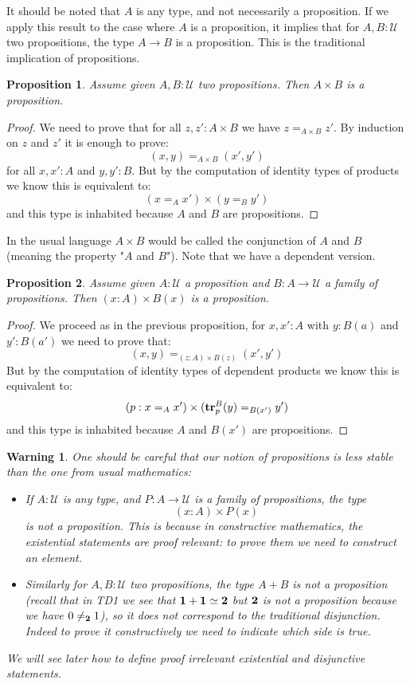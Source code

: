 \documentclass{article}
\newcommand{\U}{{\mathcal U}}
\renewcommand{\r}{\rightarrow}
\newcommand{\tr}{\mathrm{\bf tr}}
\newcommand{\one}{{\bf 1}}
\newcommand{\two}{{\bf 2}}
\newtheorem{proposition}{Proposition}
\newtheorem{warning}{\danger Warning}
\begin{document}
It should be noted that $A$ is any type, and not necessarily a proposition. If we apply this result to the case where $A$ is a proposition, it implies that for $A,B:\U$ two propositions, the type $A\r B$ is a proposition. This is the traditional implication of propositions.

\begin{proposition}
Assume given $A,B:\U$ two propositions. Then $A\times B$ is a proposition.
\end{proposition}
\begin{proof}
We need to prove that for all $z,z':A\times B$ we have $z=_{A\times B} z'$. By induction on $z$ and $z'$ it is enough to prove:
\[(x,y)=_{A\times B}(x',y')\]
for all $x,x':A$ and $y,y':B$. But by the computation of identity types of products we know this is equivalent to:
\[(x=_Ax')\times (y=_By')\]
and this type is inhabited because $A$ and $B$ are propositions.
\end{proof}

In the usual language $A\times B$ would be called the conjunction of $A$ and $B$ (meaning the property "$A$ and $B$"). Note that we have a dependent version.

\begin{proposition}
Assume given $A:\U$ a proposition and $B:A\r \U$ a family of propositions. Then $(x:A)\times B(x)$ is a proposition.
\end{proposition}
\begin{proof}
We proceed as in the previous proposition, for $x,x':A$ with $y:B(a)$ and $y':B(a')$ we need to prove that:
\[(x,y)=_{(z:A)\times B(z)}(x',y')\]
But by the computation of identity types of dependent products we know this is equivalent to:
\[(p : x=_Ax')\times (\tr_p^B(y)=_{B(x')}y')\]
and this type is inhabited because $A$ and $B(x')$ are propositions.
\end{proof}


\begin{warning}
One should be careful that our notion of propositions is less stable than the one from usual mathematics:
\begin{itemize}
\item If $A:\U$ is any type, and $P:A\r \U$ is a family of propositions, the type
\[(x:A)\times P(x)\] 
is not a proposition. This is because in constructive mathematics, the existential statements are proof relevant: to prove them we need to construct an element. 
\item Similarly for $A,B:\U$ two propositions, the type $A+B$ is not a proposition (recall that in TD1 we see that $\one+\one\simeq\two$ but $\two$ is not a proposition because we have $0\neq_{\two}1$), so it does not correspond to the traditional disjunction. Indeed to prove it constructively we need to indicate which side is true.  
\end{itemize}
We will see later how to define proof irrelevant existential and disjunctive statements.
\end{warning}
\end{document}
